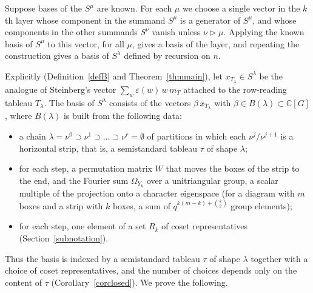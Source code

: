 \documentclass[11pt, letterpaper]{amsart}
\theoremstyle{definition}
\theoremstyle{remark}
\newcommand{\CC}{\mathbb{C}}
\begin{document}
Suppose bases of the $S^\mu$ are known. For each $\mu$ we choose a single vector in the $k$th layer whose component in the summand $S^\mu$ is a generator of $S^\mu$, and whose components in the other summands $S^\nu$ vanish unless $\nu\triangleright\mu$. Applying the known basis of $S^\mu$ to this vector, for all $\mu$, gives a basis of the layer, and repeating the construction gives a basis of $S^\lambda$ defined by recursion on $n$.

Explicitly (Definition~\ref{defB} and Theorem~\ref{thmmain}), let $x_{T_\lambda}\in S^\lambda$ be the analogue of Steinberg's vector $\sum_w\varepsilon(w)\,w\,m_T$ attached to the row-reading tableau $T_\lambda$. The basis of $S^\lambda$ consists of the vectors $\beta\,x_{T_\lambda}$ with $\beta\in B(\lambda)\subset\CC[G]$, where $B(\lambda)$ is built from the following data:
\begin{itemize}
\item a chain $\lambda=\nu^0\supset\nu^1\supset\dots\supset\nu^r=\emptyset$ of partitions in which each $\nu^j/\nu^{j+1}$ is a horizontal strip, that is, a semistandard tableau $\tau$ of shape $\lambda$;
\item for each step, a permutation matrix $W$ that moves the boxes of the strip to the end, and the Fourier sum $\Omega_{Y_k}$ over a unitriangular group, a scalar multiple of the projection onto a character eigenspace (for a diagram with $m$ boxes and a strip with $k$ boxes, a sum of $q^{k(m-k)+\binom k2}$ group elements);
\item for each step, one element of a set $R_k$ of coset representatives (Section~\ref{subnotation}).
\end{itemize}
Thus the basis is indexed by a semistandard tableau $\tau$ of shape $\lambda$ together with a choice of coset representatives, and the number of choices depends only on the content of $\tau$ (Corollary~\ref{corclosed}). We prove the following.
\end{document}

